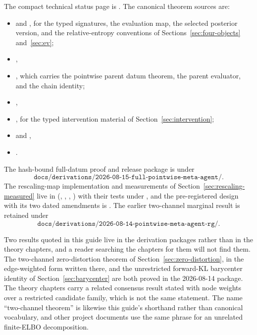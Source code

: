 \documentclass[11pt,letterpaper]{article}
\begin{document}
The compact technical status page is . The canonical theorem sources are:
\begin{itemize}
  \item {} and , for the typed signatures, the evaluation map, the selected posterior version, and the relative-entropy conventions of Sections~\ref{sec:four-objects} and~\ref{sec:ev};
  \item {},
  \item {}, which carries the pointwise parent datum theorem, the parent evaluator, and the chain identity;
  \item {},
  \item {}, for the typed intervention material of Section~\ref{sec:intervention};
  \item {} and ,
  \item {}.
\end{itemize}
The hash-bound full-datum proof and release package is under
\[
  \texttt{docs/derivations/2026-08-15-full-pointwise-meta-agent/}.
\]
The rescaling-map implementation and measurements of Section~\ref{sec:rescaling-measured} live in
 (, ,
, ) with their tests under , and
the pre-registered design with its two dated amendments is
.
The earlier two-channel marginal result is retained under
\[
  \texttt{docs/derivations/2026-08-14-pointwise-meta-agent-rg/}.
\]

Two results quoted in this guide live in the derivation packages rather than in the theory chapters, and a reader searching the chapters for them will not find them. The two-channel zero-distortion theorem of Section~\ref{sec:zero-distortion}, in the edge-weighted form written there, and the unrestricted forward-KL barycenter identity of Section~\ref{sec:barycenter} are both proved in the 2026-08-14 package. The theory chapters carry a related consensus result stated with node weights over a restricted candidate family, which is not the same statement. The name ``two-channel theorem'' is likewise this guide's shorthand rather than canonical vocabulary, and other project documents use the same phrase for an unrelated finite-ELBO decomposition.
\end{document}
